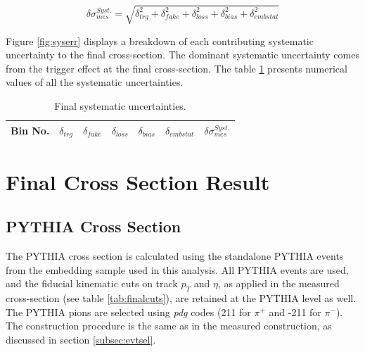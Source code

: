 \begin{equation}
    \delta\sigma_{mes}^{Syst.} = \sqrt{\delta_{trg}^2 + \delta_{fake}^2 + \delta_{loss}^2 + \delta_{bias}^2+ \delta_{embstat}^2}
\end{equation}

Figure \ref{fig:syserr} displays a breakdown of each contributing systematic uncertainty to the final cross-section. The dominant systematic uncertainty comes from the trigger effect at the final cross-section.  The table \ref{tab:syserr} presents numerical values of all the systematic uncertainties.  
 
\begin{table}
    \centering
    \begin{tabular}{ccccccc}
    \hline
    Bin No.& $\delta_{trg}$ & $\delta_{fake}$ & $\delta_{loss}$ & $\delta_{bias}$ & $\delta_{embstat}$ & $\delta\sigma_{mes}^{Syst.}$\\
    \hline
    
    \end{tabular}
    \caption{Final systematic uncertainties. }
    \label{tab:syserr}
\end{table}



\section{Final Cross Section Result}

\subsection{PYTHIA Cross Section}
The PYTHIA cross section is calculated using the standalone PYTHIA events from the embedding sample used in this analysis. All PYTHIA events are used, and the fiducial kinematic cuts on track $p_T$ and $\eta$, as applied in the measured cross-section (see table \ref{tab:finalcuts}), are retained at the PYTHIA level as well. The PYTHIA pions are selected using \emph{pdg} codes (211 for $\pi^+$ and -211 for $\pi^-$). The \dipion construction procedure is the same as in the measured construction, as discussed in section \ref{subsec:evtsel}.  

